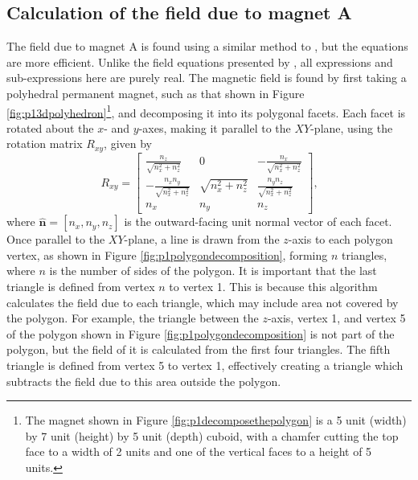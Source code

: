 \subsection{Calculation of the field due to magnet A}
The field due to magnet A is found using a similar method to \textcite{Rubeck2013}, but the equations are more efficient. Unlike the field equations presented by \textcite{Janssen2010}, all expressions and sub-expressions here are purely real. The magnetic field is found by first taking a polyhedral permanent magnet, such as that shown in Figure \ref{fig:p13dpolyhedron}\footnote{The magnet shown in Figure \ref{fig:p1decomposethepolygon} is a 5 unit (width) by 7 unit (height) by 5 unit (depth) cuboid, with a chamfer cutting the top face to a width of 2 units and one of the vertical faces to a height of 5 units.}, and decomposing it into its polygonal facets. Each facet is rotated about the \(x\)- and \(y\)-axes, making it parallel to the \(XY\)-plane, using the rotation matrix \(R_{xy}\), given by
\begin{equation}
R_{xy} = \begin{bmatrix}
\frac{n_z}{\sqrt{n_x^2+n_z^2}} & 0 & -\frac{n_x}{\sqrt{n_x^2+n_z^2}} \\
-\frac{n_xn_y}{\sqrt{n_x^2+n_z^2}} & \sqrt{n_x^2+n_z^2} & \frac{n_yn_z}{\sqrt{n_x^2+n_z^2}} \\
n_x & n_y & n_z
\end{bmatrix} \text{,}
\end{equation}
\noindent where \(\hat{\mathbf{n}} = \left[ n_x, n_y, n_z \right]\) is the outward-facing unit normal vector of each facet. Once parallel to the \(XY\)-plane, a line is drawn from the \(z\)-axis to each polygon vertex, as shown in Figure \ref{fig:p1polygondecomposition}, forming \(n\) triangles, where \(n\) is the number of sides of the polygon. It is important that the last triangle is defined from vertex \(n\) to vertex 1. This is because this algorithm calculates the field due to each triangle, which may include area not covered by the polygon. For example, the triangle between the \(z\)-axis, vertex 1, and vertex 5 of the polygon shown in Figure \ref{fig:p1polygondecomposition} is not part of the polygon, but the field of it is calculated from the first four triangles. The fifth triangle is defined from vertex 5 to vertex 1, effectively creating a triangle which subtracts the field due to this area outside the polygon.


